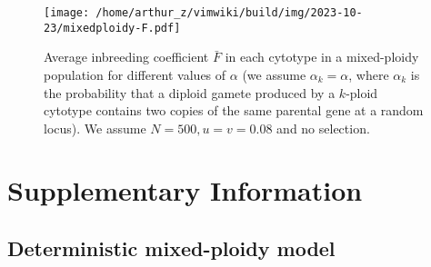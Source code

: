 \documentclass[11pt,a4paper]{article}
\begin{document}
\begin{figure}[H]
\centering
\texttt{[image: /home/arthur\_z/vimwiki/build/img/2023-10-23/mixedploidy-F.pdf]}
\caption{Average inbreeding coefficient \(\bar{F}\) in each cytotype in
a mixed-ploidy population for different values of \(\alpha\) (we assume
\(\alpha_k=\alpha\), where \(\alpha_k\) is the probability that a
diploid gamete produced by a \(k\)-ploid cytotype contains two copies of
the same parental gene at a random locus). We assume \(N=500, u=v=0.08\)
and no selection.}\label{fig:f1}
\end{figure}

\clearpage

\section{Supplementary Information}

\subsection{Deterministic mixed-ploidy model \label{sec:det}}
\end{document}
